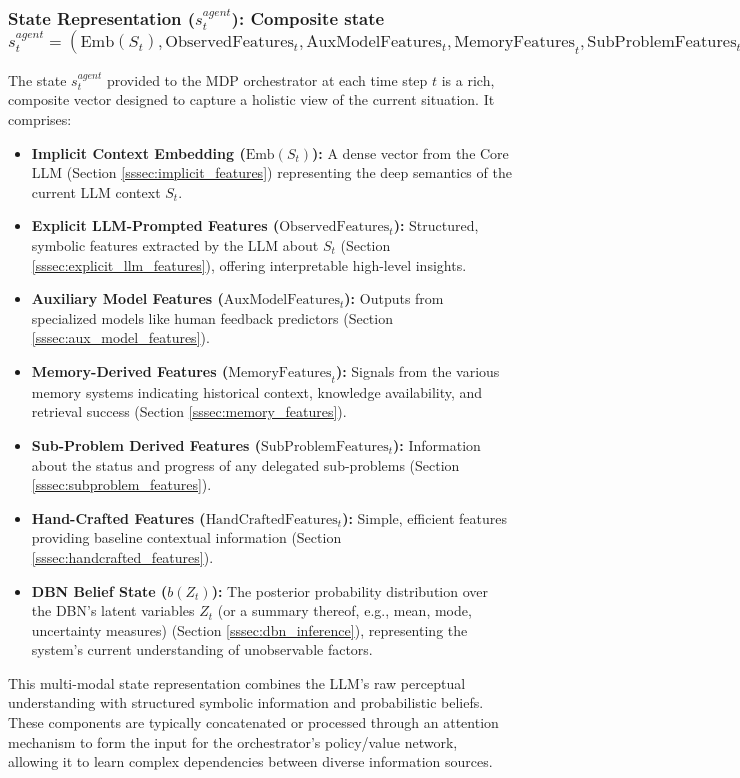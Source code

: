 \documentclass[11pt]{article}
\begin{document}
\subsubsection{State Representation ($s_t^{agent}$): Composite state $s_t^{agent} = (\text{Emb}(S_t), \text{ObservedFeatures}_t, \text{AuxModelFeatures}_t, \text{MemoryFeatures}_t, \text{SubProblemFeatures}_t, \text{HandCraftedFeatures}_t, b(Z_t))$}
\label{sssec:mdp_state}
The state $s_t^{agent}$ provided to the MDP orchestrator at each time step $t$ is a rich, composite vector designed to capture a holistic view of the current situation. It comprises:
\begin{itemize}
    \item \textbf{Implicit Context Embedding ($\text{Emb}(S_t)$):} A dense vector from the Core LLM (Section \ref{sssec:implicit_features}) representing the deep semantics of the current LLM context $S_t$.
    \item \textbf{Explicit LLM-Prompted Features ($\text{ObservedFeatures}_t$):} Structured, symbolic features extracted by the LLM about $S_t$ (Section \ref{sssec:explicit_llm_features}), offering interpretable high-level insights.
    \item \textbf{Auxiliary Model Features ($\text{AuxModelFeatures}_t$):} Outputs from specialized models like human feedback predictors (Section \ref{sssec:aux_model_features}).
    \item \textbf{Memory-Derived Features ($\text{MemoryFeatures}_t$):} Signals from the various memory systems indicating historical context, knowledge availability, and retrieval success (Section \ref{sssec:memory_features}).
    \item \textbf{Sub-Problem Derived Features ($\text{SubProblemFeatures}_t$):} Information about the status and progress of any delegated sub-problems (Section \ref{sssec:subproblem_features}).
    \item \textbf{Hand-Crafted Features ($\text{HandCraftedFeatures}_t$):} Simple, efficient features providing baseline contextual information (Section \ref{sssec:handcrafted_features}).
    \item \textbf{DBN Belief State ($b(Z_t)$):} The posterior probability distribution over the DBN's latent variables $Z_t$ (or a summary thereof, e.g., mean, mode, uncertainty measures) (Section \ref{sssec:dbn_inference}), representing the system's current understanding of unobservable factors.
\end{itemize}
This multi-modal state representation combines the LLM's raw perceptual understanding with structured symbolic information and probabilistic beliefs. These components are typically concatenated or processed through an attention mechanism to form the input for the orchestrator's policy/value network, allowing it to learn complex dependencies between diverse information sources.
\end{document}
